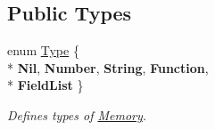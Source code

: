 \subsection*{Public Types}
\begin{DoxyCompactItemize}
\item 
\hypertarget{classMemory_a9193c3e610b1728964440284db90c812}{}enum \hyperlink{classMemory_a9193c3e610b1728964440284db90c812}{Type} \{ \\*
{\bfseries Nil}, 
{\bfseries Number}, 
{\bfseries String}, 
{\bfseries Function}, 
\\*
{\bfseries Field\+List}
 \}\label{classMemory_a9193c3e610b1728964440284db90c812}

\begin{DoxyCompactList}\small\item\em Defines types of \hyperlink{classMemory}{Memory}. \end{DoxyCompactList}\end{DoxyCompactItemize}
